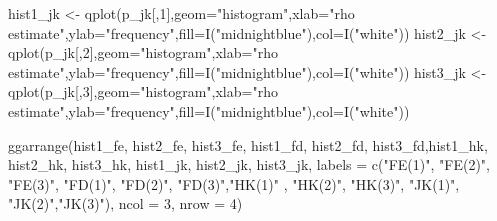 \documentclass[
]{article}
\newenvironment{Shaded}{\begin{snugshade}}{\end{snugshade}}
\newcommand{\AttributeTok}[1]{\textcolor[rgb]{0.77,0.63,0.00}{#1}}
\newcommand{\DecValTok}[1]{\textcolor[rgb]{0.00,0.00,0.81}{#1}}
\newcommand{\FunctionTok}[1]{\textcolor[rgb]{0.00,0.00,0.00}{#1}}
\newcommand{\NormalTok}[1]{#1}
\newcommand{\OtherTok}[1]{\textcolor[rgb]{0.56,0.35,0.01}{#1}}
\newcommand{\StringTok}[1]{\textcolor[rgb]{0.31,0.60,0.02}{#1}}
\begin{document}
\begin{Shaded}
\begin{Highlighting}[]
\NormalTok{hist1\_jk }\OtherTok{\textless{}{-}} \FunctionTok{qplot}\NormalTok{(p\_jk[,}\DecValTok{1}\NormalTok{],}\AttributeTok{geom=}\StringTok{"histogram"}\NormalTok{,}\AttributeTok{xlab=}\StringTok{"rho estimate"}\NormalTok{,}\AttributeTok{ylab=}\StringTok{"frequency"}\NormalTok{,}\AttributeTok{fill=}\FunctionTok{I}\NormalTok{(}\StringTok{"midnightblue"}\NormalTok{),}\AttributeTok{col=}\FunctionTok{I}\NormalTok{(}\StringTok{"white"}\NormalTok{)) }
\NormalTok{hist2\_jk }\OtherTok{\textless{}{-}} \FunctionTok{qplot}\NormalTok{(p\_jk[,}\DecValTok{2}\NormalTok{],}\AttributeTok{geom=}\StringTok{"histogram"}\NormalTok{,}\AttributeTok{xlab=}\StringTok{"rho estimate"}\NormalTok{,}\AttributeTok{ylab=}\StringTok{"frequency"}\NormalTok{,}\AttributeTok{fill=}\FunctionTok{I}\NormalTok{(}\StringTok{"midnightblue"}\NormalTok{),}\AttributeTok{col=}\FunctionTok{I}\NormalTok{(}\StringTok{"white"}\NormalTok{)) }
\NormalTok{hist3\_jk }\OtherTok{\textless{}{-}} \FunctionTok{qplot}\NormalTok{(p\_jk[,}\DecValTok{3}\NormalTok{],}\AttributeTok{geom=}\StringTok{"histogram"}\NormalTok{,}\AttributeTok{xlab=}\StringTok{"rho estimate"}\NormalTok{,}\AttributeTok{ylab=}\StringTok{"frequency"}\NormalTok{,}\AttributeTok{fill=}\FunctionTok{I}\NormalTok{(}\StringTok{"midnightblue"}\NormalTok{),}\AttributeTok{col=}\FunctionTok{I}\NormalTok{(}\StringTok{"white"}\NormalTok{)) }

\FunctionTok{ggarrange}\NormalTok{(hist1\_fe, hist2\_fe, hist3\_fe, hist1\_fd, hist2\_fd, hist3\_fd,hist1\_hk, }
\NormalTok{          hist2\_hk, hist3\_hk, hist1\_jk, hist2\_jk, hist3\_jk,}
          \AttributeTok{labels =} \FunctionTok{c}\NormalTok{(}\StringTok{"FE(1)"}\NormalTok{, }\StringTok{"FE(2)"}\NormalTok{, }\StringTok{"FE(3)"}\NormalTok{, }\StringTok{"FD(1)"}\NormalTok{, }\StringTok{"FD(2)"}\NormalTok{, }\StringTok{"FD(3)"}\NormalTok{,}\StringTok{"HK(1)"}
\NormalTok{                     , }\StringTok{"HK(2)"}\NormalTok{,  }\StringTok{"HK(3)"}\NormalTok{, }\StringTok{"JK(1)"}\NormalTok{, }\StringTok{"JK(2)"}\NormalTok{,}\StringTok{"JK(3)"}\NormalTok{),}
          \AttributeTok{ncol =} \DecValTok{3}\NormalTok{, }\AttributeTok{nrow =} \DecValTok{4}\NormalTok{)}


\end{Highlighting}
\end{Shaded}
\end{document}
